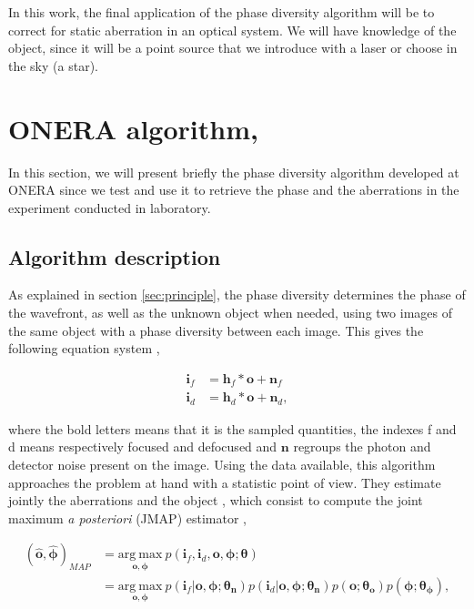 In this work, the final application of the phase diversity algorithm will be to correct for static aberration in an optical system. We will have knowledge of the object, since it will be a point source that we introduce with a laser or choose in the sky (a star).

\section[ONERA algorithm]{ONERA algorithm, \citet{mugnier_2006}}
\label{sec:ONERAalgo}

In this section, we will present briefly the phase diversity algorithm developed at ONERA since we test and use it to retrieve the phase and the aberrations in the experiment conducted in laboratory.

\subsection{Algorithm description}
\label{subsec:OneraAlgoDesc}

As explained in section \ref{sec:principle}, the phase diversity determines the phase of the wavefront, as well as the unknown object when needed, using two images of the same object with a phase diversity between each image. This gives the following equation system \citep[p.11]{mugnier_2006},

\begin{align}
\mathbf{i}_f &= \mathbf{h}_f \ast \mathbf{o} + \mathbf{n}_f \\
\mathbf{i}_d &= \mathbf{h}_d \ast \mathbf{o} + \mathbf{n}_d,
\label{eqt:systemEQT}
\end{align}

where the bold letters means that it is the sampled quantities, the indexes f and d means respectively focused and defocused and $\mathbf{n}$ regroups the photon and detector noise present on the image. Using the data available, this algorithm approaches the problem at hand with a statistic point of view. They estimate jointly the aberrations and the object \citep{Paxman1992}, which consist to compute the joint maximum \textit{a posteriori} (JMAP) estimator \citep[p.17]{mugnier_2006},

\begin{align}
(\hat{\mathbf{o}},\hat{\boldsymbol{\phi}})_{MAP} &= \underset{\mathbf{o},\boldsymbol{\phi}}{\mathrm{arg \ max}} \ p(\mathbf{i}_f,\mathbf{i}_d,\mathbf{o},\boldsymbol{\phi};\boldsymbol{\theta})\nonumber \\
&= \underset{\mathbf{o},\boldsymbol{\phi}}{\mathrm{arg \ max}} \ p(\mathbf{i}_f|\mathbf{o},\boldsymbol{\phi};\boldsymbol{\theta_n})p(\mathbf{i}_d|\mathbf{o},\boldsymbol{\phi};\boldsymbol{\theta_n})p(\mathbf{o};\boldsymbol{\theta_o})p(\boldsymbol{\phi};\boldsymbol{\theta_{\phi}}), 
\end{align}

